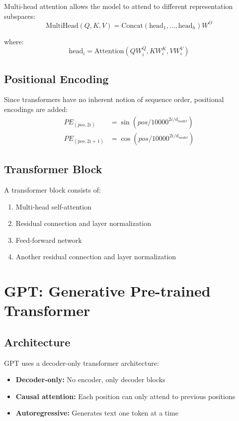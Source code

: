 Multi-head attention allows the model to attend to different representation subspaces:
\begin{equation}
    \text{MultiHead}(Q, K, V) = \text{Concat}(\text{head}_1, \ldots, \text{head}_h)W^O
\end{equation}

where:
\begin{equation}
    \text{head}_i = \text{Attention}(QW_i^Q, KW_i^K, VW_i^V)
\end{equation}

\subsection{Positional Encoding}

Since transformers have no inherent notion of sequence order, positional encodings are added:
\begin{align}
    PE_{(pos, 2i)} &= \sin(pos / 10000^{2i/d_{model}}) \\
    PE_{(pos, 2i+1)} &= \cos(pos / 10000^{2i/d_{model}})
\end{align}

\subsection{Transformer Block}

A transformer block consists of:
\begin{enumerate}
    \item Multi-head self-attention
    \item Residual connection and layer normalization
    \item Feed-forward network
    \item Another residual connection and layer normalization
\end{enumerate}

\section{GPT: Generative Pre-trained Transformer}

\subsection{Architecture}

GPT uses a decoder-only transformer architecture:
\begin{itemize}
    \item \textbf{Decoder-only:} No encoder, only decoder blocks
    \item \textbf{Causal attention:} Each position can only attend to previous positions
    \item \textbf{Autoregressive:} Generates text one token at a time
\end{itemize}

